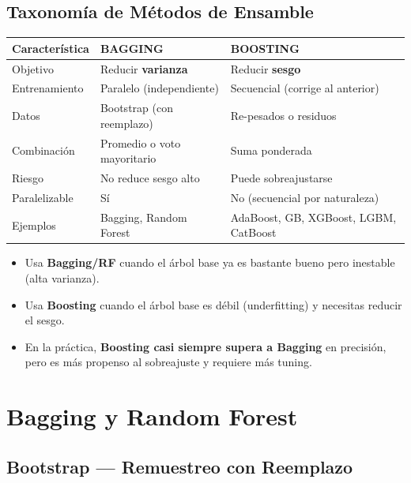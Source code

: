 \documentclass[11pt, a4paper]{book}
\begin{document}
\section{Taxonomía de Métodos de Ensamble}

\begin{center}
  \begin{tabular}{lll}
    \toprule
    \textbf{Característica} & \textbf{BAGGING} & \textbf{BOOSTING}\\
    \midrule
    Objetivo & Reducir \textbf{varianza} & Reducir \textbf{sesgo}\\
    Entrenamiento & Paralelo (independiente) & Secuencial (corrige al anterior)\\
    Datos & Bootstrap (con reemplazo) & Re-pesados o residuos\\
    Combinación & Promedio o voto mayoritario & Suma ponderada\\
    Riesgo & No reduce sesgo alto & Puede sobreajustarse\\
    Paralelizable & Sí & No (secuencial por naturaleza)\\
    Ejemplos & Bagging, Random Forest & AdaBoost, GB, XGBoost, LGBM, CatBoost\\
    \bottomrule
  \end{tabular}
\end{center}

\begin{cuando}
  \begin{itemize}
    \item Usa \textbf{Bagging/RF} cuando el árbol base ya es bastante bueno pero inestable (alta varianza).
    \item Usa \textbf{Boosting} cuando el árbol base es débil (underfitting) y necesitas reducir el sesgo.
    \item En la práctica, \textbf{Boosting casi siempre supera a Bagging} en precisión, pero es más
          propenso al sobreajuste y requiere más tuning.
  \end{itemize}
\end{cuando}

\chapter{Bagging y Random Forest}

\section{Bootstrap — Remuestreo con Reemplazo}
\end{document}
